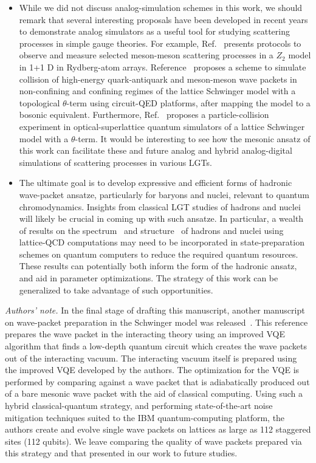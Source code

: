 \documentclass[a4paper,onecolumn,11pt,accepted=2024-10-11]{quantumarticle}
\begin{document}
\begin{itemize}
\item[$\diamond$]{While we did not discuss analog-simulation schemes in this work, we should remark that several interesting proposals have been developed in recent years to demonstrate analog simulators as a useful tool for studying scattering processes in simple gauge theories. For example, Ref.~\cite{Surace:2020ycc} presents protocols to observe and measure selected meson-meson scattering processes in a $Z_2$ model in 1+1 D in Rydberg-atom arrays. Reference~\cite{Belyansky:2023rgh} proposes a scheme to simulate collision of high-energy quark-antiquark and meson-meson wave packets in non-confining and confining regimes of the lattice Schwinger model with a topological $\theta$-term using circuit-QED platforms, after mapping the model to a bosonic equivalent. Furthermore, Ref.~\cite{Su:2024uuc} proposes a particle-collision experiment in optical-superlattice quantum simulators of a lattice Schwinger model with a $\theta$-term. It would be interesting to see how the mesonic ansatz of this work can facilitate these and future analog and hybrid analog-digital simulations of scattering processes in various LGTs.
}
%
\item[$\diamond$]{The ultimate goal is to develop expressive and efficient forms of hadronic wave-packet ansatze, particularly for baryons and nuclei, relevant to quantum chromodynamics. Insights from classical LGT studies of hadrons and nuclei will likely be crucial in coming up with such ansatze. In particular, a wealth of results on the spectrum~\cite{Detmold:2019ghl,Bulava:2022ovd,Prelovsek:2023sta} and structure~\cite{Constantinou:2020hdm,Hagler:2009ni} of hadrons and nuclei using lattice-QCD computations may need to be incorporated in state-preparation schemes on quantum computers to reduce the required quantum resources. These results can potentially both inform the form of the hadronic ansatz, and aid in parameter optimizations. The strategy of this work can be generalized to take advantage of such opportunities.
}
\end{itemize}
%

\vspace{0.5 cm}
\noindent
\emph{Authors' note.} In the final stage of drafting this manuscript, another manuscript on wave-packet preparation in the Schwinger model was released~\cite{Farrell:2024fit}. This reference prepares the wave packet in the interacting theory using an improved VQE algorithm that finds a low-depth quantum circuit which creates the wave packets out of the interacting vacuum. The interacting vacuum itself is prepared using the improved VQE developed by the authors. The optimization for the VQE is performed by comparing against a wave packet that is adiabatically produced out of a bare mesonic wave packet with the aid of classical computing. Using such a hybrid classical-quantum strategy, and performing state-of-the-art noise mitigation techniques suited to the IBM quantum-computing platform, the authors create and evolve single wave packets on lattices as large as 112 staggered sites (112 qubits). We leave comparing the quality of wave packets prepared via this strategy and that presented in our work to future studies.
\end{document}
